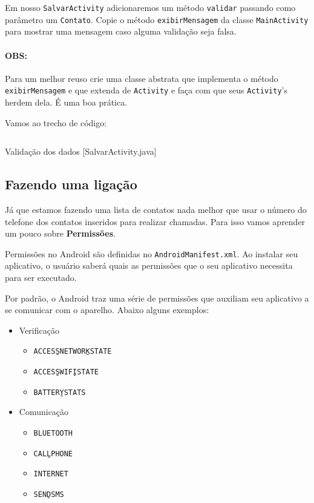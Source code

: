 Em nosso \texttt{SalvarActivity} adicionaremos um método \texttt{validar} passando como parâmetro
um \texttt{Contato}. Copie o método \texttt{exibirMensagem} da classe \texttt{MainActivity} para
mostrar uma mensagem caso alguma validação seja falsa.

\paragraph{OBS:} Para um melhor reuso crie uma classe abstrata que implementa o método \texttt{exibirMensagem}
e que extenda de \texttt{Activity} e faça com que seus \texttt{Activity}'s herdem dela. É uma boa
prática.

Vamos ao trecho de código:

\begin{listing}[H]
  \inputminted[linenos=true,frame=bottomline,tabsize=3]{ java }{ source/SalvarActivity-4.java }
  \caption{Validação dos dados [SalvarActivity.java]}
\end{listing}

\subsection{Fazendo uma ligação}

Já que estamos fazendo uma lista de contatos nada melhor que usar o número do telefone dos
contatos inseridos para realizar chamadas. Para isso vamos aprender um pouco sobre \textbf{Permissões}.

Permissões no Android são definidas no \texttt{AndroidManifest.xml}. Ao instalar seu aplicativo,
o usuário saberá quais as permissões que o seu aplicativo necessita para ser executado.

Por padrão, o Android traz uma série de permissões que auxiliam seu aplicativo a se comunicar com
o aparelho. Abaixo alguns exemplos:

\begin{itemize}
\item Verificação
\begin{itemize}
  \item \texttt{ACCESS\b{ }NETWORK\b{ }STATE}
  \item \texttt{ACCESS\b{ }WIFI\b{ }STATE}
  \item \texttt{BATTERY\b{ }STATS}
\end{itemize}

\item Comunicação
\begin{itemize}
  \item \texttt{BLUETOOTH}
  \item \texttt{CALL\b{ }PHONE}
  \item \texttt{INTERNET}
  \item \texttt{SEND\b{ }SMS}
\end{itemize}

\end{itemize}

